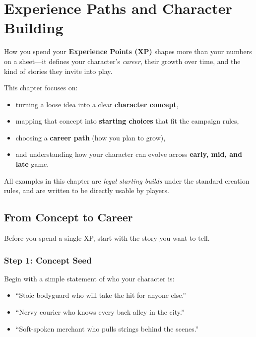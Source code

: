 \chapter{Experience Paths and Character Building}
\label{ch:xp-paths}

How you spend your \textbf{Experience Points (XP)} shapes more than your
numbers on a sheet—it defines your character's \emph{career}, their growth
over time, and the kind of stories they invite into play.

This chapter focuses on:
\begin{itemize}
  \item turning a loose idea into a clear \textbf{character concept},
  \item mapping that concept into \textbf{starting choices} that fit the campaign rules,
  \item choosing a \textbf{career path} (how you plan to grow),
  \item and understanding how your character can evolve across \textbf{early, mid, and late} game.
\end{itemize}

All examples in this chapter are \emph{legal starting builds} under the standard
creation rules, and are written to be directly usable by players.


\section{From Concept to Career}
\label{sec:xp-concept-to-career}

Before you spend a single XP, start with the story you want to tell.

\subsection*{Step 1: Concept Seed}
\label{sec:xp-concept-seed}

Begin with a simple statement of who your character is:
\begin{itemize}
  \item ``Stoic bodyguard who will take the hit for anyone else.''
  \item ``Nervy courier who knows every back alley in the city.''
  \item ``Soft-spoken merchant who pulls strings behind the scenes.''
\end{itemize}

